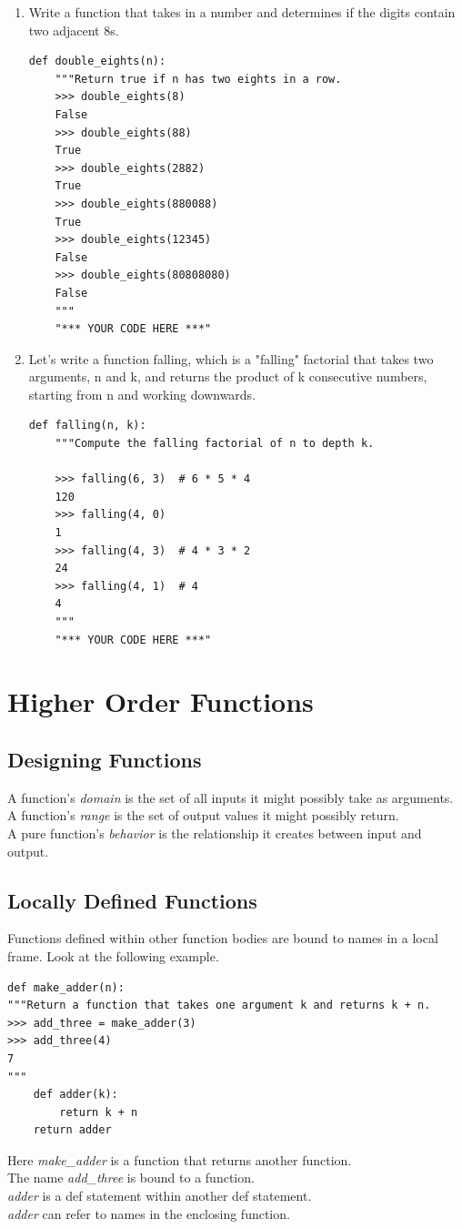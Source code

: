 \documentclass[11pt]{article}
\begin{document}
\begin{enumerate}[leftmargin = *]
\begin{lstlisting}
    >>> sum_digits(10) # 1 + 0 = 1
    1
    >>> sum_digits(4224) # 4 + 2 + 2 + 4 = 12
    12
    >>> sum_digits(1234567890)
    45
    """
    "*** YOUR CODE HERE ***"
\end{lstlisting}
\item Write a function that takes in a number and determines if the digits contain two adjacent 8s.
\begin{lstlisting}
def double_eights(n):
    """Return true if n has two eights in a row.
    >>> double_eights(8)
    False
    >>> double_eights(88)
    True
    >>> double_eights(2882)
    True
    >>> double_eights(880088)
    True
    >>> double_eights(12345)
    False
    >>> double_eights(80808080)
    False
    """
    "*** YOUR CODE HERE ***"
\end{lstlisting}
\item Let's write a function falling, which is a "falling" factorial that takes two arguments, n and k, and returns the product of k consecutive numbers, starting from n and working downwards.
\begin{lstlisting}
def falling(n, k):
    """Compute the falling factorial of n to depth k.

    >>> falling(6, 3)  # 6 * 5 * 4
    120
    >>> falling(4, 0)
    1
    >>> falling(4, 3)  # 4 * 3 * 2
    24
    >>> falling(4, 1)  # 4
    4
    """
    "*** YOUR CODE HERE ***"
\end{lstlisting}
\end{enumerate}

\newpage
\section{Higher Order Functions}
\subsection{Designing Functions}
A function's \textit{domain} is the set of all inputs it might possibly take as arguments. \\
A function's \textit{range} is the set of output values it might possibly return. \\
A pure function's \textit{behavior} is the relationship it creates between input and output. 
\subsection{Locally Defined Functions} 
Functions defined within other function bodies are bound to names in a local frame. Look at the following example. 
\begin{lstlisting}
def make_adder(n): 
"""Return a function that takes one argument k and returns k + n.
>>> add_three = make_adder(3)
>>> add_three(4)
7
"""
	def adder(k):
		return k + n
	return adder
\end{lstlisting} 
Here \textit{make\_adder} is a function that returns another function. \\ 
The name \textit{add\_three} is bound to a function. \\ 
\textit{adder} is a def statement within another def statement. \\
\textit{adder} can refer to names in the enclosing function. 
\end{document}
